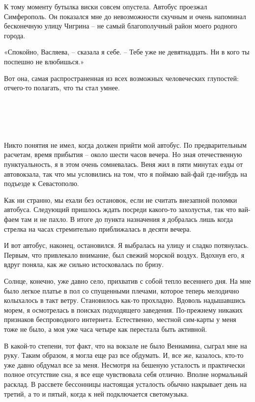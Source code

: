 \documentclass[
]{book}
\begin{document}
К тому моменту бутылка виски совсем опустела. Автобус проезжал Симферополь. Он показался мне до невозможности скучным и очень напоминал бесконечную улицу Чигрина -- не самый благополучный район моего родного города.

«Спокойно, Васляева, -- сказала я себе. -- Тебе уже не девятнадцать. Ни в кого ты поспешно не влюбишься.»

Вот она, самая распространенная из всех возможных человеческих глупостей: отчего-то полагать, что ты стал умнее.

\hypertarget{chapter-7}{%
\chapter{~}\label{chapter-7}}

Никто понятия не имел, когда должен прийти мой автобус. По предварительным расчетам, время прибытия -- около шести часов вечера. Но зная отечественную пунктуальность, я в этом очень сомневалась. Веня жил в пяти минутах езды от автовокзала, так что мы условились на том, что я поймаю вай-фай где-нибудь на подъезде к Севастополю.

Как ни странно, мы ехали без остановок, если не считать внезапной поломки автобуса. Следующий пришлось ждать посреди какого-то захолустья, так что вай-фаем там и не пахло. В итоге до пункта назначения я добралась лишь когда стрелка на часах стремительно приближалась в десяти вечера.

И вот автобус, наконец, остановился. Я выбралась на улицу и сладко потянулась. Первым, что привлекало внимание, был свежий морской воздух. Вдохнув его, я вдруг поняла, как же сильно истосковалась по бризу.

Солнце, конечно, уже давно село, прихватив с собой тепло весеннего дня. На мне было легкое платье в пол со спущенными плечами, которое теперь мелодично колыхалось в такт ветру. Становилось как-то прохладно. Вдоволь надышавшись морем, я осмотрелась в поисках подходящего заведения. По-прежнему никаких признаков беспроводного интернета. Естественно, местной сим-карты у меня тоже не было, а моя уже часа четыре как перестала быть активной.

В какой-то степени, тот факт, что на вокзале не было Вениамина, сыграл мне на руку. Таким образом, я могла еще раз все обдумать. И, все же, казалось, кто-то уже давно обдумал все за меня. Несмотря на бешеную усталость и практически полное отсутствие сна, я все еще чувствовала себя отлично. Вполне нормальный расклад. В рассвете бессонницы настоящая усталость обычно накрывает день на третий, а то и пятый, когда к ней подключается светомузыка.
\end{document}
